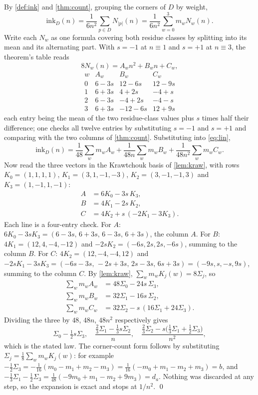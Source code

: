 \documentclass[11pt]{amsart}
\theoremstyle{definition}
\theoremstyle{remark}
\begin{document}
By \cref{def:ink} and \cref{thm:count}, grouping the corners of $D$ by weight,
\begin{equation}
\mathrm{ink}_D(n) = \frac{1}{6n^2}\sum_{p \in D} N_{|p|}(n) = \frac{1}{6n^2}\sum_{w=0}^{3} m_w N_w(n).
\label{eq:lin}
\end{equation}
Write each $N_w$ as one formula covering both residue classes by splitting into its mean and its alternating part. With $s = -1$ at $n \equiv 1$ and $s = +1$ at $n \equiv 3$, the theorem's table reads
\[
8N_w(n) = A_w n^2 + B_w n + C_w,
\]
\[
\begin{array}{c|ccc}
 w & A_w & B_w & C_w\\ \hline
0 & 6-3s & 12-6s & 12-9s\\
1 & 6+3s & 4+2s & -4+s\\
2 & 6-3s & -4+2s & -4-s\\
3 & 6+3s & -12-6s & 12+9s
\end{array}
\]
each entry being the mean of the two residue-class values plus $s$ times half their difference; one checks all twelve entries by substituting $s = -1$ and $s = +1$ and comparing with the two columns of \cref{thm:count}. Substituting into \cref{eq:lin},
\[
\mathrm{ink}_D(n) = \frac{1}{48}\sum_w m_w A_w
 + \frac{1}{48n}\sum_w m_w B_w
 + \frac{1}{48n^2}\sum_w m_w C_w .
\]
Now read the three vectors in the Krawtchouk basis of \cref{lem:kraw}, with rows $K_0 = (1,1,1,1)$, $K_1 = (3,1,-1,-3)$, $K_2 = (3,-1,-1,3)$ and $K_3 = (1,-1,1,-1)$:
\[
\begin{aligned}
A &= 6K_0 - 3s\,K_3, \\
B &= 4K_1 - 2s\,K_2, \\
C &= 4K_2 + s\,(-2K_1 - 3K_3).
\end{aligned}
\]
Each line is a four-entry check. For $A$: $6K_0 - 3sK_3 = (6-3s,\,6+3s,\,6-3s,\,6+3s)$, the column $A$. For $B$: $4K_1 = (12,4,-4,-12)$ and $-2sK_2 = (-6s,2s,2s,-6s)$, summing to the column $B$. For $C$: $4K_2 = (12,-4,-4,12)$ and $-2sK_1 - 3sK_3 = (-6s-3s,\,-2s+3s,\,2s-3s,\,6s+3s) = (-9s,s,-s,9s)$, summing to the column $C$. By \cref{lem:kraw}, $\sum_w m_w K_j(w) = 8\Sigma_j$, so
\[
\begin{aligned}
\sum_w m_w A_w &= 48\Sigma_0 - 24 s\, \Sigma_3,\\
\sum_w m_w B_w &= 32\Sigma_1 - 16 s\, \Sigma_2,\\
\sum_w m_w C_w &= 32\Sigma_2 - s\,(16\Sigma_1 + 24\Sigma_3).
\end{aligned}
\]
Dividing the three by $48$, $48n$, $48n^2$ respectively gives
\[
\Sigma_0 - \tfrac12 s \Sigma_3,
\quad
\frac{\tfrac23\Sigma_1 - \tfrac13 s \Sigma_2}{n},
\quad
\frac{\tfrac23\Sigma_2 - s\bigl(\tfrac13\Sigma_1 + \tfrac12\Sigma_3\bigr)}{n^2},
\]
which is the stated law. The corner-count form follows by substituting $\Sigma_j = \tfrac18\sum_w m_w K_j(w)$: for example $-\tfrac12\Sigma_3 = -\tfrac1{16}(m_0-m_1+m_2-m_3) = \tfrac1{16}(-m_0+m_1-m_2+m_3) = b$, and $-\tfrac13\Sigma_1 - \tfrac12\Sigma_3 = \tfrac{1}{48}(-9m_0+m_1-m_2+9m_3) = d_a$. Nothing was discarded at any step, so the expansion is exact and stops at $1/n^2$. \qed
\end{document}
